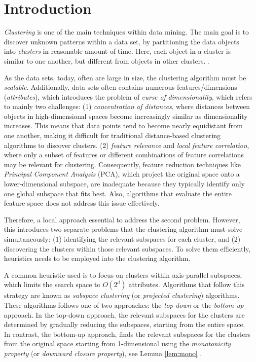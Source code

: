 \section{Introduction}
\textit{Clustering} is one of the main techniques within data mining. The main goal is to discover unknown patterns within a data set, by partitioning the data objects into \textit{clusters} in reasonable amount of time. Here, each object in a cluster is similar to one another, but different from objects in other clusters. \cite[p.~444]{han-2011}.

As the data sets, today, often are large in size, the clustering algorithm must be \textit{scalable}. Additionally, data sets often contains numerous features/dimensions (\textit{attributes}), which introduces the problem of \textit{curse of dimensionality}, which refers to mainly two challenges: (1) \textit{concentration of distances}, where distances between objects in high-dimensional spaces become increasingly similar as dimensionality increases. This means that data points tend to become nearly equidistant from one another, making it difficult for traditional distance-based clustering algorithms to discover clusters. (2) \textit{feature relevance} and \textit{local feature correlation}, where only a subset of features or different combinations of feature correlations may be relevant for clustering. Consequently, feature reduction techniques like \textit{Principal Component Analysis} (PCA), which project the original space onto a lower-dimensional subspace, are inadequate because they typically identify only one global subspace that fits best. Also, algorithms that evaluate the entire feature space does not address this issue effectively. \cite[p.~43--46]{kriegel-2009}

Therefore, a local approach essential to address the second problem. However, this introduces two separate problems that the clustering algorithm must solve simultaneously: (1) identifying the relevant subspaces for each cluster, and (2) discovering the clusters within those relevant subspaces. To solve them efficiently, heuristics needs to be employed into the clustering algorithm. \cite[p.~6--7]{kriegel-2009}

A common heuristic used is to focus on clusters within axis-parallel subspaces, which limits the search space to $O(2^d)$ attributes. Algorithms that follow this strategy are known as \textit{subspace clustering} (or \textit{projected clustering}) algorithms. These algorithms follows one of two approaches: the \textit{top-down} or the \textit{bottom-up} approach. In the top-down approach, the relevant subspaces for the clusters are determined by gradually reducing the subspaces, starting from the entire space. In contrast, the bottom-up approach, finds the relevant subspaces for the clusters from the original space starting from 1-dimensional using the \textit{monotonicity property} (or \textit{downward closure property}), see Lemma \ref{lem:mono} \cite{clique}. \cite[p.~8,~11]{kriegel-2009}

